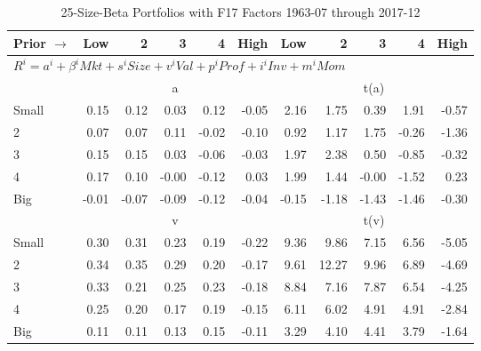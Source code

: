 
\begin{table}[!ht]
\footnotesize
\centering
\caption{25-Size-Beta Portfolios with F17 Factors 1963-07 through 2017-12}
\begin{tabular}{lrrrrrrrrrr}
  \toprule
    Prior $\rightarrow$ & Low & 2 & 3 & 4 & High & Low & 2 & 3 & 4 & High \\ 
  \midrule
  \multicolumn{11}{l}{$R^i=a^i+\beta^iMkt+s^iSize+v^iVal+p^iProf+i^iInv+m^iMom$} \\

  
    
      & \multicolumn{5}{c}{a} & \multicolumn{5}{c}{t(a)}
    
    \\
      \cmidrule(r){2-6} \cmidrule(r){7-11}

    Small   & 0.15  & 0.12  & 0.03  & 0.12  & -0.05  & 2.16  & 1.75  & 0.39  & 1.91  & -0.57  \\
         2  & 0.07  & 0.07  & 0.11  & -0.02  & -0.10  & 0.92  & 1.17  & 1.75  & -0.26  & -1.36  \\
         3  & 0.15  & 0.15  & 0.03  & -0.06  & -0.03  & 1.97  & 2.38  & 0.50  & -0.85  & -0.32  \\
         4  & 0.17  & 0.10  & -0.00  & -0.12  & 0.03  & 1.99  & 1.44  & -0.00  & -1.52  & 0.23  \\
    Big     & -0.01  & -0.07  & -0.09  & -0.12  & -0.04  & -0.15  & -1.18  & -1.43  & -1.46  & -0.30  \\

  
    
      & \multicolumn{5}{c}{v} & \multicolumn{5}{c}{t(v)}
    
    \\
      \cmidrule(r){2-6} \cmidrule(r){7-11}

    Small   & 0.30  & 0.31  & 0.23  & 0.19  & -0.22  & 9.36  & 9.86  & 7.15  & 6.56  & -5.05  \\
         2  & 0.34  & 0.35  & 0.29  & 0.20  & -0.17  & 9.61  & 12.27  & 9.96  & 6.89  & -4.69  \\
         3  & 0.33  & 0.21  & 0.25  & 0.23  & -0.18  & 8.84  & 7.16  & 7.87  & 6.54  & -4.25  \\
         4  & 0.25  & 0.20  & 0.17  & 0.19  & -0.15  & 6.11  & 6.02  & 4.91  & 4.91  & -2.84  \\
    Big     & 0.11  & 0.11  & 0.13  & 0.15  & -0.11  & 3.29  & 4.10  & 4.41  & 3.79  & -1.64  \\

  
    

\end{tabular}
\end{table}

